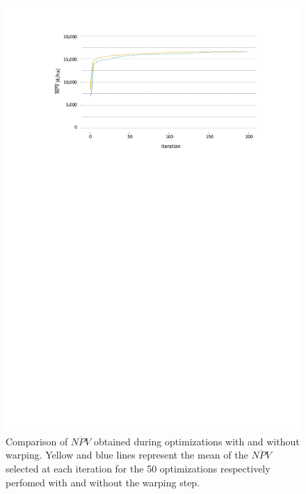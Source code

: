 \begin{figure}[!ht]
	\centering
	\includegraphics[trim = 3.1cm 18.1cm 2.7cm 1.9cm, clip, width=\textwidth]{Figures_Warping_resultats_courbes_moyennes_mean_NPV_warping_sanswarping.pdf}
	\caption{Comparison of $\overline{NPV}$ obtained during optimizations with and without warping. 
		Yellow and blue lines represent the mean of the $\overline{NPV}$ selected at each iteration for the 50 optimizations respectively perfomed with and without the warping step. }\label{fig:moyennesNPV}
\end{figure}

